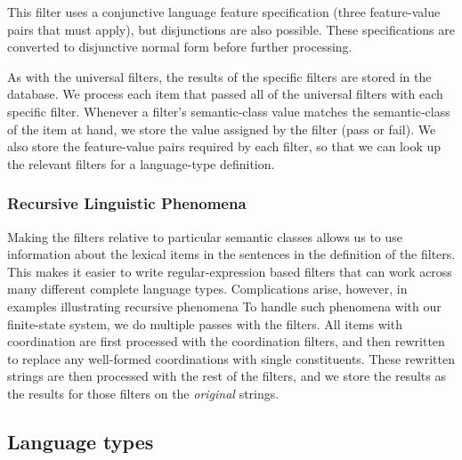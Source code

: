\documentclass[11pt]{article}
\begin{document}
%
This filter uses a conjunctive language feature specification
(three feature-value pairs that must apply), but disjunctions are
also possible.  These
specifications are converted to disjunctive normal form before
further processing.

As with the universal filters, the results of the specific filters are
stored in the database.  We process each item that passed all of the
universal filters with each specific filter.  Whenever a filter's
semantic-class value matches the semantic-class of the item at hand,
we store the value assigned by the filter (pass or fail).  We also
store the feature-value pairs required by each filter, so that we can
look up the relevant filters for a language-type definition.


\subsubsection{Recursive Linguistic Phenomena}

Making the filters relative to particular semantic classes
allows us to use information about the lexical items in 
the sentences in the definition of the filters.  This makes
it easier to write regular-expression based filters that
can work across many different complete language types. 
Complications arise, however, in examples illustrating recursive phenomena
To handle such phenomena with our finite-state system, we do multiple
passes with the filters.  All items with coordination are first processed
with the coordination filters, and then rewritten to replace any
well-formed coordinations with single constituents.  These rewritten
strings are then processed with the rest of the filters, and we store
the results as the results for those filters on the {\it original}
strings.

\subsection{Language types}
\end{document}
